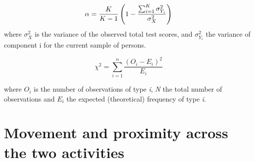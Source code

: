 	


\begin{equation} \label{eq:cronbach}
\alpha = {K \over K-1 } \left(1 - {\sum_{i=1}^K \sigma^2_{Y_i}\over \sigma^2_X}\right)
\end{equation}   
where $ \sigma^2_X $ is the variance of the observed total test scores, and $ \sigma^2_{Y_i} $ the variance of component i for the current sample of persons.

\begin{equation}\label{eq:chi}
 \chi^2 = \sum_{i=1}^{n} \frac{(O_i - E_i)^2}{E_i}  
\end{equation}

where $ O_i $ is the number of observations of type \textit{i}, \textit{N} the total number of observations and $ E_i $ the expected (theoretical) frequency of type \textit{i}.

\section{Movement and proximity across the two activities} \label{ap:across}







%

